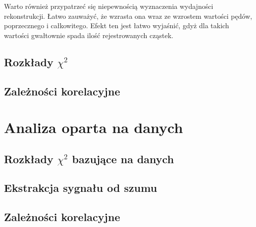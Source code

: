 Warto również przypatrzeć się niepewnością wyznaczenia wydajności rekonstrukcji. Łatwo zauważyć, że wzrasta ona wraz ze wzrostem wartości pędów, poprzecznego i całkowitego. Efekt ten jest łatwo wyjaśnić, gdyż dla takich wartości gwałtownie spada ilość rejestrowanych cząstek.  

\subsection{Rozkłady $\chi^2$}
\subsection{Zależności korelacyjne}
\section{Analiza oparta na danych}
\subsection{Rozkłady $\chi^2$ bazujące na danych}
\subsection{Ekstrakcja sygnału od szumu}
\subsection{Zależności korelacyjne}